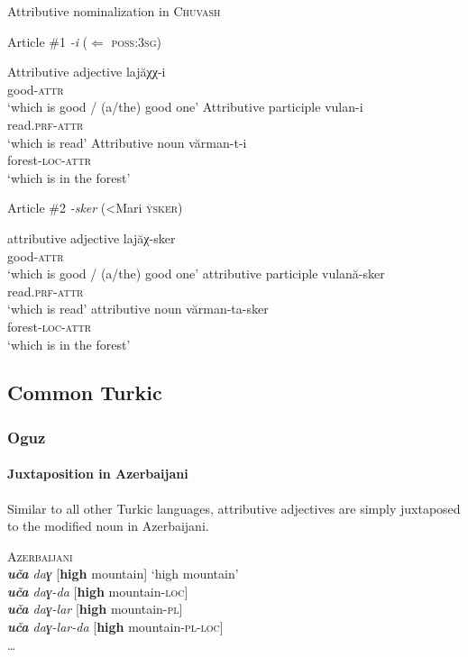 \begin{exe}
\ex Attributive nominalization in \textsc{Chuvash} \citep{krueger1961}
\begin{xlist}
\ex Article \#1 \textit{-i} ($\Leftarrow$ \textsc{poss:3sg})
\begin{xlist}
\ex	Attributive adjective
\gll	lajăχχ-i\\
	good-\textsc{attr}\\
\glt	‘which is good / (a/the) good one’
\ex	Attributive participle
\gll	vulan-i\\
	read.\textsc{prf}-\textsc{attr}\\
\glt	‘which is read’
\ex	Attributive noun
\gll	vărman-t-i\\
	forest-\textsc{loc}-\textsc{attr}\\
\glt	‘which is in the forest’
\end{xlist}
\ex Article \#2 \textit{-sker} (<Mari \textsc{ÿsker})
\begin{xlist}
\ex	attributive adjective
\gll	lajăχ-sker\\
	good-\textsc{attr}\\
\glt	‘which is good / (a/the) good one’
\ex	attributive participle
\gll	vulană-sker\\
	read.\textsc{prf}-\textsc{attr}\\
\glt	‘which is read’
\ex	attributive noun
\gll	vărman-ta-sker\\
	forest-\textsc{loc}-\textsc{attr}\\
\glt	‘which is in the forest’
\end{xlist}
\end{xlist}
\end{exe}

\subsection{Common Turkic}
\subsubsection{Oguz}
\paragraph{Juxtaposition in Azerbaijani} Similar to all other Turkic languages, attributive adjectives are simply juxtaposed to the modified noun in Azerbaijani.
\begin{exe}
\ex \textsc{Azerbaijani} \citep[59–60]{siraliev-etal1971}\\
\textit{\textbf{uča} daɣ} [\textbf{high} mountain] ‘high mountain’\\
\textit{\textbf{uča} daɣ-da} [\textbf{high} mountain-\textsc{loc}]\\
\textit{\textbf{uča} daɣ-lar} [\textbf{high} mountain-\textsc{pl}]\\
\textit{\textbf{uča} daɣ-lar-da} [\textbf{high} mountain-\textsc{pl}-\textsc{loc}]\\
\dots \label{azerb juxt}
\end{exe}


